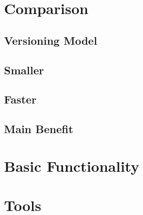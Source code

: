 \begin{frame}
 \titlepage
\end{frame}

\section{Comparison}
	
	\subsection{Versioning Model}
	
	\subsection{Smaller}
	
	\subsection{Faster}
	
	\subsection{Main Benefit}
	
\section{Basic Functionality}











\section{Tools}

